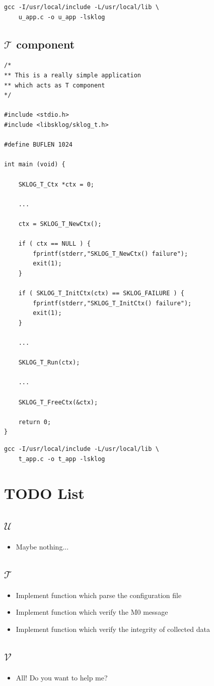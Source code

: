 \documentclass[a4paper,12pt]{article}
\def\u{$\mathcal{U}$\xspace}
\def\t{$\mathcal{T}$\xspace}
\def\v{$\mathcal{V}$\xspace}
\begin{document}
\begin{lstlisting}
gcc -I/usr/local/include -L/usr/local/lib \
    u_app.c -o u_app -lsklog
\end{lstlisting}
\newpage
\subsection{\t component}
\begin{lstlisting}
/*
** This is a really simple application
** which acts as T component
*/

#include <stdio.h>
#include <libsklog/sklog_t.h>

#define BUFLEN 1024

int main (void) {

    SKLOG_T_Ctx *ctx = 0;

    ...

    ctx = SKLOG_T_NewCtx();

    if ( ctx == NULL ) {
        fprintf(stderr,"SKLOG_T_NewCtx() failure");
        exit(1);
    }

    if ( SKLOG_T_InitCtx(ctx) == SKLOG_FAILURE ) {
        fprintf(stderr,"SKLOG_T_InitCtx() failure");
        exit(1);
    }

    ...
    
    SKLOG_T_Run(ctx);

    ...

    SKLOG_T_FreeCtx(&ctx);

    return 0;
} 
\end{lstlisting}

\begin{lstlisting}
gcc -I/usr/local/include -L/usr/local/lib \
    t_app.c -o t_app -lsklog
\end{lstlisting}
\newpage
\section{TODO List}

\subsection{\u}

\begin{itemize}
\item Maybe nothing...
\end{itemize}

\subsection{\t}

\begin{itemize}
\item Implement function which parse the configuration file
\item Implement function which verify the M0 message
\item Implement function which verify the integrity of collected data
\end{itemize}

\subsection{\v}

\begin{itemize}
\item All! Do you want to help me?
\end{itemize}
\end{document}
